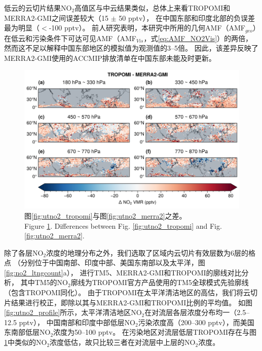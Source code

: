 低云的云切片结果NO$_2$高值区与中云结果类似，总体上来看TROPOMI和MERRA2-GMI之间误差较大（15 $\pm$ 50 pptv），
在中国东部和印度北部的负误差最为明显（$<$-100 pptv）。
前人研究表明，本研究中所用的几何AMF（AMF$_{geo}$）在低云和污染条件下可达可见AMF（AMF$_{Vis}$，式\ref{eq:AMF_NO2Vis}）的两倍\citep{BelmonteRivas.2015}，然而这不足以解释中国东部地区的模拟值为观测值的3--5倍。
因此，该差异反映了MERRA2-GMI使用的ACCMIP排放清单在中国东部未能及时更新。


\begin{figure}[H]
    \centering
    \includegraphics[width=13cm]{./figures/utno2_delta.png}
    \caption{
    图\ref{fig:utno2_tropomi}与图\ref{fig:utno2_merra2}之差。 \\
    Figure \ref{fig:utno2_delta}. Differences between Fig. \ref{fig:utno2_tropomi} and Fig. \ref{fig:utno2_merra2}.
    }
    \label{fig:utno2_delta}
\end{figure}



除了各层NO$_2$浓度的地理分布之外，我们选取了区域内云切片有效层数为6层的格点
（分别位于中国南部、印度中部、美国东南部以及太平洋，图\ref{fig:no2_ltngcount}a），
进行TM5、MERRA2-GMI和TROPOMI的廓线对比分析，
其中TM5的NO$_2$廓线为TROPOMI官方产品使用的TM5全球模式先验廓线（包含TROPOMI同化）。
由于TROPOMI在太平洋清洁地区的高估，我们将云切片结果进行校正，即除以其与MERRA2-GMI和TROPOMI比例的平均值。
如图\ref{fig:utno2_profile}所示，太平洋清洁地区NO$_2$在对流层各层浓度分布均一（2.5--12.5 pptv），
中国南部和印度中部低层NO$_2$污染浓度高（200--300 pptv），而美国东南部低层NO$_2$浓度为50--100 pptv。
在污染地区对流层低层TROPOMI存在与图\ref{fig:utno2_delta}中类似的NO$_2$浓度低估，故只比较三者在对流层中上层的NO$_2$浓度。

